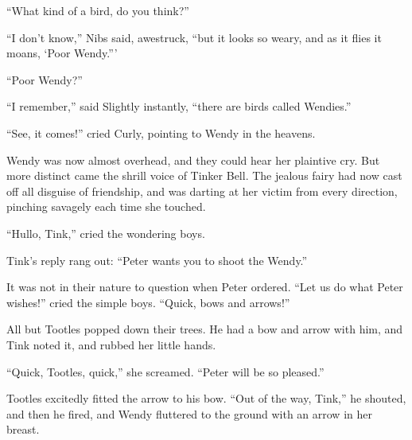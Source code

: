 ``What kind of a bird, do you think?''

``I don't know,'' Nibs said, awestruck, ``but it looks so weary, and as it
flies it moans, ‘Poor Wendy.'''

``Poor Wendy?''

``I remember,'' said Slightly instantly, ``there are birds called
Wendies.''

``See, it comes!'' cried Curly, pointing to Wendy in the heavens.

Wendy was now almost overhead, and they could hear her plaintive cry.
But more distinct came the shrill voice of Tinker Bell. The jealous
fairy had now cast off all disguise of friendship, and was darting at
her victim from every direction, pinching savagely each time she
touched.

``Hullo, Tink,'' cried the wondering boys.

Tink's reply rang out: ``Peter wants you to shoot the Wendy.''

It was not in their nature to question when Peter ordered. ``Let us do
what Peter wishes!'' cried the simple boys. ``Quick, bows and arrows!''

All but Tootles popped down their trees. He had a bow and arrow with
him, and Tink noted it, and rubbed her little hands.

``Quick, Tootles, quick,'' she screamed. ``Peter will be so pleased.''

Tootles excitedly fitted the arrow to his bow. ``Out of the way, Tink,''
he shouted, and then he fired, and Wendy fluttered to the ground with
an arrow in her breast.

